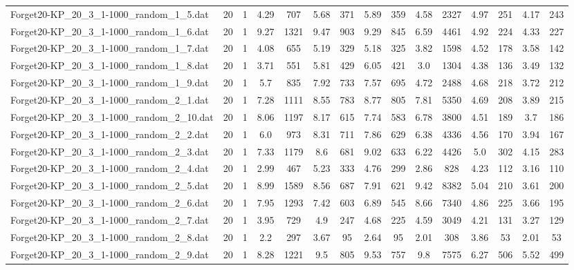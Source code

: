 \begin{table}[!ht]
{\begin{tabular}{lcccccccccccccc}
Forget20-KP\_20\_3\_1-1000\_random\_1\_5.dat & 20 & 1 & 4.29 & 707 & 5.68 & 371 & 5.89 & 359 & 4.58 & 2327 & 4.97 & 251 & 4.17 & 243 \\
Forget20-KP\_20\_3\_1-1000\_random\_1\_6.dat & 20 & 1 & 9.27 & 1321 & 9.47 & 903 & 9.29 & 845 & 6.59 & 4461 & 4.92 & 224 & 4.33 & 227 \\
Forget20-KP\_20\_3\_1-1000\_random\_1\_7.dat & 20 & 1 & 4.08 & 655 & 5.19 & 329 & 5.18 & 325 & 3.82 & 1598 & 4.52 & 178 & 3.58 & 142 \\
Forget20-KP\_20\_3\_1-1000\_random\_1\_8.dat & 20 & 1 & 3.71 & 551 & 5.81 & 429 & 6.05 & 421 & 3.0 & 1304 & 4.38 & 136 & 3.49 & 132 \\
Forget20-KP\_20\_3\_1-1000\_random\_1\_9.dat & 20 & 1 & 5.7 & 835 & 7.92 & 733 & 7.57 & 695 & 4.72 & 2488 & 4.68 & 218 & 3.72 & 212 \\
Forget20-KP\_20\_3\_1-1000\_random\_2\_1.dat & 20 & 1 & 7.28 & 1111 & 8.55 & 783 & 8.77 & 805 & 7.81 & 5350 & 4.69 & 208 & 3.89 & 215 \\
Forget20-KP\_20\_3\_1-1000\_random\_2\_10.dat & 20 & 1 & 8.06 & 1197 & 8.17 & 615 & 7.74 & 583 & 6.78 & 3800 & 4.51 & 189 & 3.7 & 186 \\
Forget20-KP\_20\_3\_1-1000\_random\_2\_2.dat & 20 & 1 & 6.0 & 973 & 8.31 & 711 & 7.86 & 629 & 6.38 & 4336 & 4.56 & 170 & 3.94 & 167 \\
Forget20-KP\_20\_3\_1-1000\_random\_2\_3.dat & 20 & 1 & 7.33 & 1179 & 8.6 & 681 & 9.02 & 633 & 6.22 & 4426 & 5.0 & 302 & 4.15 & 283 \\
Forget20-KP\_20\_3\_1-1000\_random\_2\_4.dat & 20 & 1 & 2.99 & 467 & 5.23 & 333 & 4.76 & 299 & 2.86 & 828 & 4.23 & 112 & 3.16 & 110 \\
Forget20-KP\_20\_3\_1-1000\_random\_2\_5.dat & 20 & 1 & 8.99 & 1589 & 8.56 & 687 & 7.91 & 621 & 9.42 & 8382 & 5.04 & 210 & 3.61 & 200 \\
Forget20-KP\_20\_3\_1-1000\_random\_2\_6.dat & 20 & 1 & 7.95 & 1293 & 7.42 & 603 & 6.89 & 545 & 8.66 & 7340 & 4.86 & 225 & 3.66 & 195 \\
Forget20-KP\_20\_3\_1-1000\_random\_2\_7.dat & 20 & 1 & 3.95 & 729 & 4.9 & 247 & 4.68 & 225 & 4.59 & 3049 & 4.21 & 131 & 3.27 & 129 \\
Forget20-KP\_20\_3\_1-1000\_random\_2\_8.dat & 20 & 1 & 2.2 & 297 & 3.67 & 95 & 2.64 & 95 & 2.01 & 308 & 3.86 & 53 & 2.01 & 53 \\
Forget20-KP\_20\_3\_1-1000\_random\_2\_9.dat & 20 & 1 & 8.28 & 1221 & 9.5 & 805 & 9.53 & 757 & 9.8 & 7575 & 6.27 & 506 & 5.52 & 499 \\

\end{tabular}}
\end{table}
